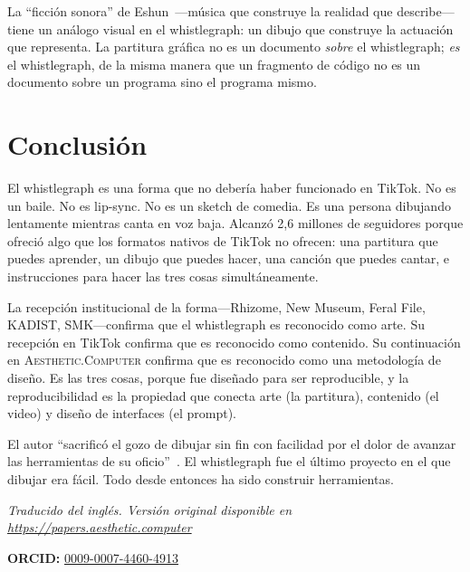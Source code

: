 \documentclass[10pt,letterpaper,twocolumn]{article}
\newcommand{\ac}{\textsc{Aesthetic.Computer}}
\begin{document}
La ``ficción sonora'' de Eshun~\citep{eshun1998more}---música que construye la realidad que describe---tiene un análogo visual en el whistlegraph: un dibujo que construye la actuación que representa. La partitura gráfica no es un documento \emph{sobre} el whistlegraph; \emph{es} el whistlegraph, de la misma manera que un fragmento de código no es un documento sobre un programa sino el programa mismo.

\section{Conclusión}

El whistlegraph es una forma que no debería haber funcionado en TikTok. No es un baile. No es lip-sync. No es un sketch de comedia. Es una persona dibujando lentamente mientras canta en voz baja. Alcanzó 2,6 millones de seguidores porque ofreció algo que los formatos nativos de TikTok no ofrecen: una partitura que puedes aprender, un dibujo que puedes hacer, una canción que puedes cantar, e instrucciones para hacer las tres cosas simultáneamente.

La recepción institucional de la forma---Rhizome, New Museum, Feral File, KADIST, SMK---confirma que el whistlegraph es reconocido como arte. Su recepción en TikTok confirma que es reconocido como contenido. Su continuación en \ac{} confirma que es reconocido como una metodología de diseño. Es las tres cosas, porque fue diseñado para ser reproducible, y la reproducibilidad es la propiedad que conecta arte (la partitura), contenido (el video) y diseño de interfaces (el prompt).

El autor ``sacrificó el gozo de dibujar sin fin con facilidad por el dolor de avanzar las herramientas de su oficio''~\citep{scudder2019drawing}. El whistlegraph fue el último proyecto en el que dibujar era fácil. Todo desde entonces ha sido construir herramientas.

\vspace{0.5em}
\noindent\textit{Traducido del inglés. Versión original disponible en \url{https://papers.aesthetic.computer}}

\vspace{0.5em}
\noindent\textbf{ORCID:} \href{https://orcid.org/0009-0007-4460-4913}{0009-0007-4460-4913}



\end{document}
